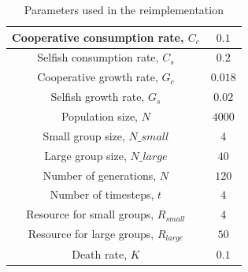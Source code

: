 \documentclass[11pt]{ecsarticle}
\begin{document}
\begin{table}
 \begin{tabular}{|c|c|}\hline
  Cooperative consumption rate, $C_c$	&	$0.1$		\\ \hline
  Selfish consumption rate, $C_s$	&	$0.2$		\\ \hline
  Cooperative growth rate, $G_c$	&	$0.018$		\\ \hline
  Selfish growth rate, $G_s$		&	$0.02$		\\ \hline
  Population size, $N$			&	$4000$		\\ \hline
  Small group size, $N\_small$		&	$4$		\\ \hline
  Large group size, $N\_large$		&	$40$		\\ \hline
  Number of generations, $N$		&	$120$		\\ \hline
  Number of timesteps, $t$		&	$4$		\\ \hline
  Resource for small groups, $R_{small}$&	$4$		\\ \hline
  Resource for large groups, $R_{large}$&	$50$		\\ \hline
  Death rate, $K$			&	$0.1$		\\ \hline
 \end{tabular}
 \caption{Parameters used in the reimplementation}
 \label{table:params}
\end{table}
\end{document}
